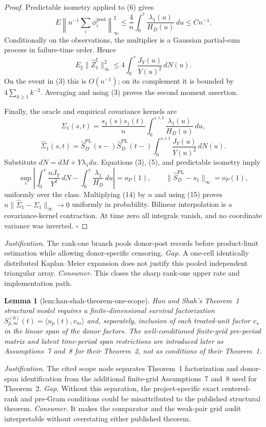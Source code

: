 \documentclass{article}
\newtheorem{lemma}{Lemma}
\begin{document}
\begin{proof}
Predictable isometry applied to (6) gives
\[
 E\left\|n^{-1}\sum_i\phi_i^{\mathrm{pool}}\right\|_\infty^2
 \le \frac4n\int_0^{\bar\tau}\frac{\lambda_1(u)}{H_D(u)}\,du
 \le Cn^{-1}.                                             \tag{12}
\]
Conditionally on the observations, the multiplier is a Gaussian partial-sum process in failure-time order. Hence
\[
 E_\xi\|\widehat Z_1^\xi\|_\infty^2
 \le4\int_0^{\bar\tau}\frac{J_Y(u)}{Y(u)^2}\,dN(u).     \tag{13}
\]
On the event in (3) this is \(O(n^{-1})\); on its complement it is bounded by \(4\sum_{k\ge1}k^{-2}\). Averaging and using (3) proves the second moment assertion.

Finally, the oracle and empirical covariance kernels are
\[
 \Sigma_1(s,t)=\frac{s_1(s)s_1(t)}n
 \int_0^{s\wedge t}\frac{\lambda_1(u)}{H_D(u)}\,du,
\]
\[
 \widehat\Sigma_1(s,t)=\widehat S_D^{\mathrm{PL}}(s-)
 \widehat S_D^{\mathrm{PL}}(t-)
 \int_0^{s\wedge t}\frac{J_Y(u)}{Y(u)^2}\,dN(u).         \tag{14}
\]
Substitute \(dN=dM+Y\lambda_1du\). Equations (3), (5), and predictable isometry imply
\[
 \sup_v\left|\int_0^v\frac{nJ_Y}{Y^2}\,dN
 -\int_0^v\frac{\lambda_1}{H_D}\,du\right|=o_P(1),
 \qquad \|\widehat S_D^{\mathrm{PL}}-s_1\|_\infty=o_P(1), \tag{15}
\]
uniformly over the class. Multiplying (14) by \(n\) and using (15) proves
\(n\|\widehat\Sigma_1-\Sigma_1\|_\infty\to0\) uniformly in probability. Bilinear interpolation is a covariance-kernel contraction. At time zero all integrals vanish, and no coordinate variance was inverted. \(\square\)
\end{proof}
\par\smallskip\noindent \textit{Justification.} The rank-one branch pools donor-post records before product-limit estimation while allowing donor-specific censoring. \textit{Gap.} A one-cell identically distributed Kaplan--Meier expansion does not justify this pooled independent triangular array. \textit{Consumer.} This closes the sharp rank-one upper rate and implementation path.

\begin{lemma}[lem:han-shah-theorem-one-scope]\label{lem:han-shah-theorem-one-scope}
Han and Shah's Theorem~1 structural model requires a finite-dimensional survival factorization \(S^{(0)}_{p,m}(t)=\langle u_p(t),v_m\rangle\) and, separately, inclusion of each treated-unit factor \(v_\star\) in the linear span of the donor factors.  The well-conditioned finite-grid pre-period matrix and latent time-period span restrictions are introduced later as Assumptions~7 and~8 for their Theorem~2, not as conditions of their Theorem~1.
\end{lemma}
\par\smallskip\noindent \textit{Justification.} The cited scope node separates Theorem~1 factorization and donor-span identification from the additional finite-grid Assumptions~7 and~8 used for Theorem~2. \textit{Gap.} Without this separation, the project-specific exact centered-rank and pre-Gram conditions could be misattributed to the published structural theorem. \textit{Consumer.} It makes the comparator and the weak-pair grid audit interpretable without overstating either published theorem.
\end{document}
